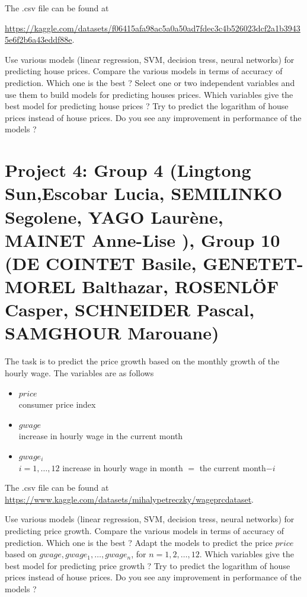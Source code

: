 \documentclass{article}
\begin{document}
   The .csv file can be found at  

   \url{https://kaggle.com/datasets/f06415afa98ac5a0a50ad7fdec3c4b526023dcf2a1b39435e6f2b6a43eddf88e}.
    
     Use various models (linear regression, SVM, decision tress, neural networks) for predicting house prices. Compare the various models in terms of accuracy of prediction. Which one is the best ? 
 Select one or two independent variables  and use them to build models for predicting houses prices. Which variables give the best 
 model for predicting  house prices  ?  Try to predict the logarithm of house prices instead of house prices. Do you see any improvement in performance of the models ?

   

\section*{Project 4: Group 4 (Lingtong Sun,Escobar Lucia, SEMILINKO Segolene, YAGO Laurène, MAINET Anne-Lise
), Group 10 (DE COINTET Basile, GENETET-MOREL Balthazar, ROSENLÖF Casper, SCHNEIDER Pascal, SAMGHOUR Marouane)}

  The task is to predict the price growth based on the monthly growth of the hourly wage. The variables are as follows
   \begin{itemize}
   \item{$price$ \\}                   consumer price index
   \item{$gwage$ \\}                    increase in hourly wage in the current month
   \item{$gwage_i$ \\} $i=1,\ldots,12$   increase in hourly wage in month $=$ the current month$- i$
  \end{itemize}

   The .csv file can be found at 
   \url{https://www.kaggle.com/datasets/mihalypetreczky/wageprcdataset}. 


    Use various models (linear regression, SVM, decision tress, neural networks) for predicting price growth. Compare the various models in terms of accuracy of prediction. Which one is the best ? 
     Adapt the models to predict the price $price$ based on $gwage,gwage_1,\ldots,gwage_n$, for $n=1,2,\ldots,12$. Which variables give the best model for predicting  price growth ?  Try to predict the logarithm of house prices instead of house prices. Do you see any improvement in performance of the models ?
\end{document}
